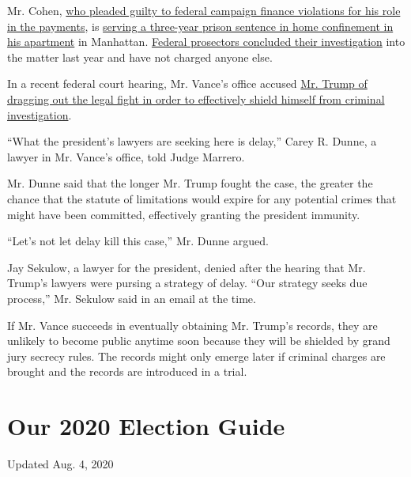 Mr. Cohen,
\href{https://www.nytimes3xbfgragh.onion/2018/11/29/nyregion/michael-cohen-trump-russia-mueller.html}{who
pleaded guilty to federal campaign finance violations for his role in
the payments}, is
\href{https://www.nytimes3xbfgragh.onion/2020/07/23/nyregion/michael-cohen-trump-book.html}{serving
a three-year prison sentence in home confinement in his apartment} in
Manhattan.
\href{https://www.nytimes3xbfgragh.onion/2019/07/17/nyregion/michael-cohen-trump-investigation.html}{Federal
prosectors concluded their investigation} into the matter last year and
have not charged anyone else.

In a recent federal court hearing, Mr. Vance's office accused
\href{https://www.nytimes3xbfgragh.onion/2020/07/16/nyregion/donald-trump-taxes-cyrus-vance.html}{Mr.
Trump of dragging out the legal fight in order to effectively shield
himself from criminal investigation}.

``What the president's lawyers are seeking here is delay,'' Carey R.
Dunne, a lawyer in Mr. Vance's office, told Judge Marrero.

Mr. Dunne said that the longer Mr. Trump fought the case, the greater
the chance that the statute of limitations would expire for any
potential crimes that might have been committed, effectively granting
the president immunity.

``Let's not let delay kill this case,'' Mr. Dunne argued.

Jay Sekulow, a lawyer for the president, denied after the hearing that
Mr. Trump's lawyers were pursing a strategy of delay. ``Our strategy
seeks due process,'' Mr. Sekulow said in an email at the time.

If Mr. Vance succeeds in eventually obtaining Mr. Trump's records, they
are unlikely to become public anytime soon because they will be shielded
by grand jury secrecy rules. The records might only emerge later if
criminal charges are brought and the records are introduced in a trial.

\hypertarget{our-2020-election-guide}{%
\section{Our 2020 Election Guide}\label{our-2020-election-guide}}

Updated Aug. 4, 2020


